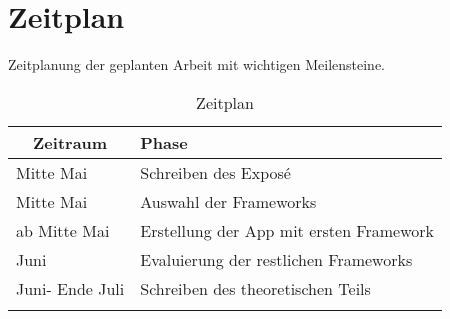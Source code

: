 \documentclass[a4paper,11pt,german,public]{INSOexpose}
\begin{document}
\section{Zeitplan}
Zeitplanung der geplanten Arbeit mit wichtigen Meilensteine.

\begin{spacing}{1.4}
\begin{longtable}{|p{.2 \linewidth}|p{.5 \linewidth}|}
	\hline
	\multicolumn{1}{|c|}{\textbf{Zeitraum}} & \textbf{Phase} \\ 
	\hline 
	Mitte Mai & Schreiben des Exposé \\ 
	\hline 
	Mitte Mai & Auswahl der Frameworks \\
	\hline 
	ab Mitte Mai & Erstellung der App mit ersten Framework \\
	\hline 
	Juni & Evaluierung der restlichen Frameworks \\
	\hline 
	Juni- Ende Juli & Schreiben des theoretischen Teils \\
	\hline
	\caption{Zeitplan}
	\label{tab:tabZeitplan}
\end{longtable}
\end{spacing}

\newpage
\nocite{dobjanschi:developing-android}
\nocite{tilko:rest}
\nocite{louis:android}
\nocite{stackOverflow:rest-client}
\nocite{burd:android}
\printbibliography
\end{document}
